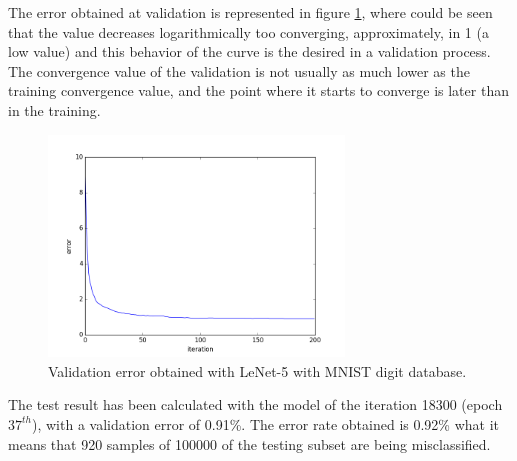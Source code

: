 The error obtained at validation is represented in figure \ref{fig:Lenetresult}, where could be seen that the value decreases logarithmically too converging, approximately, in 1 (a low value) and this behavior of the curve is the desired in a validation process. The convergence value of the validation is not usually as much lower as the training convergence value, and the point where it starts to converge is later than in the training.\\

\begin{figure}[htb]
\centering
\includegraphics[width=0.7\textwidth]{images/ModificandoLenet/error_lenet.png}
\caption{Validation error obtained with LeNet-5 with MNIST digit database.} \label{fig:Lenetresult}
\end{figure}

The test result has been calculated with the model of the iteration 18300 (epoch $37^{th}$), with a validation error of 0.91\%. The error rate obtained is 0.92\% what it means that 920 samples of 100000 of the testing subset are being misclassified.


